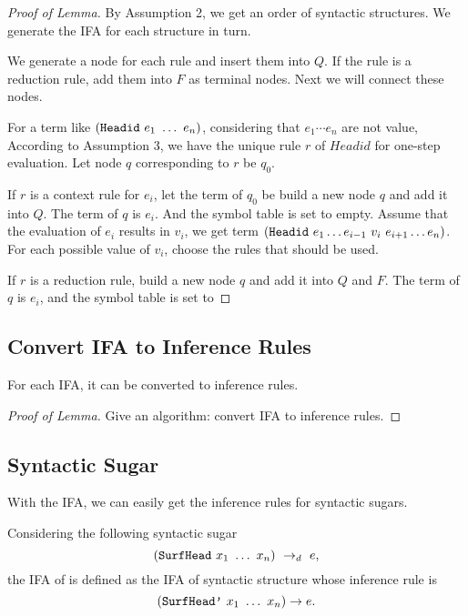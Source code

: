 \begin{proof}[Proof of Lemma]

By Assumption 2, we get an order of syntactic structures. We generate the IFA for each structure in turn.

We generate a node for each rule and insert them into $Q$. If the rule is a reduction rule, add them into $F$ as terminal nodes. Next we will connect these nodes.

For a term like $(\mbox{\tt Headid}~e_1~\ldots~e_n)$, considering that $e_1\cdots e_n$ are not value, According to Assumption 3, we have the unique rule $r$ of $Headid$ for one-step evaluation. Let node $q$ corresponding to $r$ be $q_0$.

If $r$ is a context rule for $e_i$, let the term of $q_0$ be build a new node $q$ and add it into $Q$. The term of $q$ is $e_i$. And the symbol table is set to empty. Assume that the evaluation of $e_i$ results in $v_i$, we get term $(\mbox{\tt Headid}~e_1 \ldots e_{i-1}~v_i~e_{i+1} \ldots e_n)$. For each possible value of $v_i$, choose the rules that should be used. 

If $r$ is a reduction rule, build a new node $q$ and add it into $Q$ and $F$. The term of $q$ is $e_i$, and the symbol table is set to 



\end{proof}

\subsection{Convert IFA to Inference Rules}

\begin{lemma}
For each IFA, it can be converted to inference rules.
\end{lemma}

\begin{proof}[Proof of Lemma]
Give an algorithm: convert IFA to inference rules.
\end{proof}

\subsection{Syntactic Sugar}

With the IFA, we can easily get the inference rules for syntactic sugars.

\begin{Def}

Considering the following syntactic sugar 
\[
(\mbox{\tt SurfHead}~x_1~\ldots~x_n) ~\rightarrow_d~ e,
\] 
the IFA of  is defined as the IFA of syntactic structure  whose inference rule is
\[
(\mbox{\tt SurfHead'}~x_1~\ldots~x_n)\rightarrow e.
\]



\end{Def}
